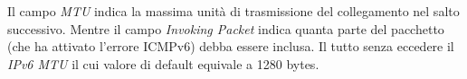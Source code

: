 \vspace{1ex} \newline 
Il campo \textit{MTU} indica la massima unità di trasmissione del collegamento nel salto successivo. 
Mentre il campo \textit{Invoking Packet} indica quanta parte del pacchetto (che ha attivato l'errore ICMPv6) 
debba essere inclusa. Il tutto senza eccedere il \textit{IPv6 MTU} il cui valore di default equivale a 1280 bytes.


